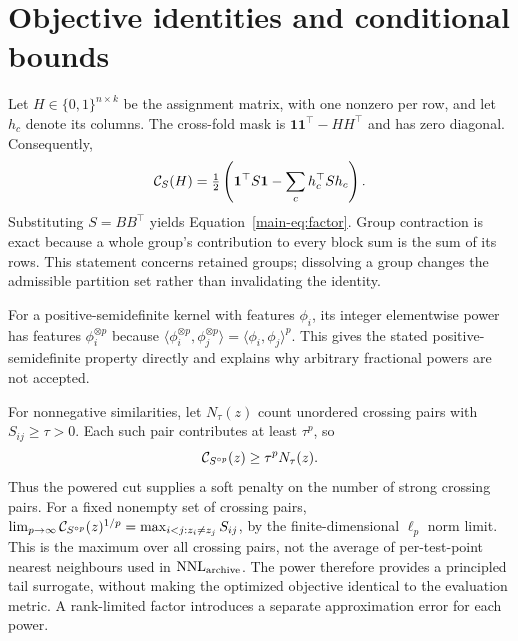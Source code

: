 \section{Objective identities and conditional bounds}
\label{app:theory}

Let $H\in\{0,1\}^{n\times k}$ be the assignment matrix, with one nonzero per row,
and let $h_c$ denote its columns. The cross-fold mask is
$\mathbf{1}\mathbf{1}^\top-HH^\top$ and has zero diagonal. Consequently,
\begin{equation}
 \mathcal{C}_S(H)=\tfrac12\left(\mathbf{1}^\top S\mathbf{1}
                       -\sum_c h_c^\top S h_c\right).
\end{equation}
Substituting $S=BB^\top$ yields Equation~\ref{main-eq:factor}. Group contraction is exact
because a whole group's contribution to every block sum is the sum of its rows.
This statement concerns retained groups; dissolving a group changes the admissible
partition set rather than invalidating the identity.

For a positive-semidefinite kernel with features $\phi_i$, its integer elementwise
power has features $\phi_i^{\otimes p}$ because
$\langle\phi_i^{\otimes p},\phi_j^{\otimes p}\rangle=
\langle\phi_i,\phi_j\rangle^p$. This gives the stated positive-semidefinite
property directly and explains why arbitrary fractional powers are not accepted.

For nonnegative similarities, let $N_\tau(z)$ count unordered crossing pairs
with $S_{ij}\ge\tau>0$. Each such pair contributes at least $\tau^p$, so
\begin{equation}
 \mathcal{C}_{S^{\circ p}}(z)\ge\tau^p N_\tau(z).
\end{equation}
Thus the powered cut supplies a soft penalty on the number of strong crossing
pairs. For a fixed nonempty set of crossing pairs,
$\lim_{p\to\infty}\mathcal{C}_{S^{\circ p}}(z)^{1/p}
=\max_{i<j:z_i\ne z_j}S_{ij}$, by the finite-dimensional $\ell_p$ norm limit.
This is the maximum over all crossing pairs, not the average of per-test-point
nearest neighbours used in $\operatorname{NNL}_{\mathrm{archive}}$. The power therefore provides a principled
tail surrogate, without making the optimized objective identical to the
evaluation metric. A rank-limited factor introduces a separate approximation
error for each power.

